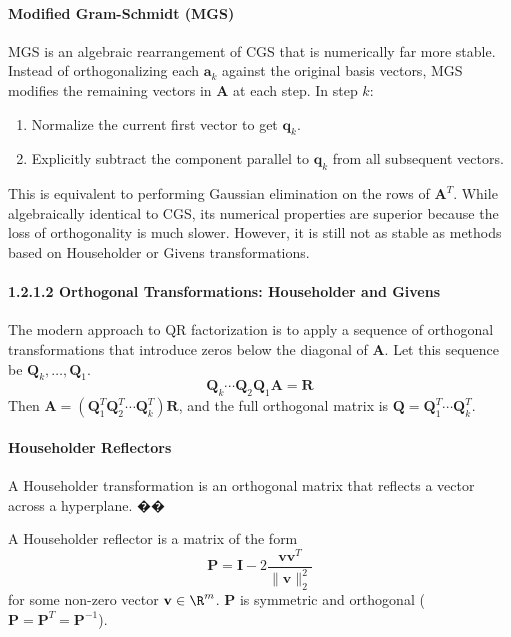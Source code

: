 \begin{proposition}
\paragraph{Modified Gram-Schmidt (MGS)}
MGS is an algebraic rearrangement of CGS that is numerically far more stable. Instead of orthogonalizing each $\mathbf{a}_k$ against the original basis vectors, MGS modifies the remaining vectors in $\mathbf{A}$ at each step.
In step $k$:
\begin{enumerate}
    \item Normalize the current first vector to get $\mathbf{q}_k$.
    \item Explicitly subtract the component parallel to $\mathbf{q}_k$ from all subsequent vectors.
\end{enumerate}
This is equivalent to performing Gaussian elimination on the rows of $\mathbf{A}^T$. While algebraically identical to CGS, its numerical properties are superior because the loss of orthogonality is much slower. However, it is still not as stable as methods based on Householder or Givens transformations.

\paragraph{1.2.1.2 Orthogonal Transformations: Householder and Givens}
The modern approach to QR factorization is to apply a sequence of orthogonal transformations that introduce zeros below the diagonal of $\mathbf{A}$. Let this sequence be $\mathbf{Q}_k, \dots, \mathbf{Q}_1$.
\[ \mathbf{Q}_k \cdots \mathbf{Q}_2 \mathbf{Q}_1 \mathbf{A} = \mathbf{R} \]
Then $\mathbf{A} = (\mathbf{Q}_1^T \mathbf{Q}_2^T \cdots \mathbf{Q}_k^T) \mathbf{R}$, and the full orthogonal matrix is $\mathbf{Q} = \mathbf{Q}_1^T \cdots \mathbf{Q}_k^T$.

\paragraph{Householder Reflectors}
A Householder transformation is an orthogonal matrix that reflects a vector across a hyperplane. ��


\begin{definition}
A Householder reflector is a matrix of the form
\[ \mathbf{P} = \mathbf{I} - 2 \frac{\mathbf{v}\mathbf{v}^T}{\|\mathbf{v}\|_2^2} \]
for some non-zero vector $\mathbf{v} \in \R^m$. $\mathbf{P}$ is symmetric and orthogonal ($\mathbf{P} = \mathbf{P}^T = \mathbf{P}^{-1}$).
\end{definition}


\end{proposition}
